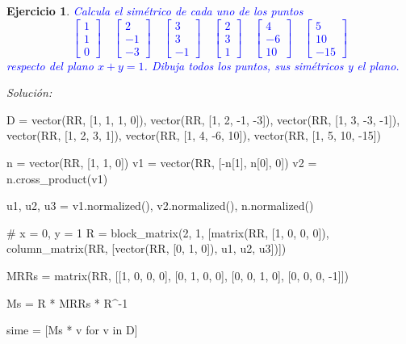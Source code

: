 \documentclass{amsart}
\newtheorem{ejer}{Ejercicio}
\begin{document}
\newpage


\begin{ejer}
\textcolor{blue}{Calcula el simétrico de cada uno de los puntos
$$
	\left[\begin{array}{c}1\\1\\0\end{array}\right] \quad
	\left[\begin{array}{c}2\\-1\\-3\end{array}\right] \quad
	\left[\begin{array}{c}3\\3\\-1\end{array}\right] \quad
	\left[\begin{array}{c}2\\3\\1\end{array}\right] \quad
	\left[\begin{array}{c}4\\-6\\10\end{array}\right] \quad
	\left[\begin{array}{c}5\\10\\-15\end{array}\right]
$$ 
respecto del plano $x+y=1$. Dibuja todos los puntos, sus simétricos y el plano.}
\end{ejer}

{\it Solución:}

\begin{sageblock}
D = vector(RR, [1, 1, 1, 0]), vector(RR, [1, 2, -1, -3]), vector(RR, [1, 3, -3, -1]), vector(RR, [1, 2, 3, 1]), vector(RR, [1, 4, -6, 10]), vector(RR, [1, 5, 10, -15])

n = vector(RR, [1, 1, 0])
v1 = vector(RR, [-n[1], n[0], 0])
v2 = n.cross_product(v1)

u1, u2, u3 = v1.normalized(), v2.normalized(), n.normalized()

# x = 0, y = 1
R = block_matrix(2, 1, [matrix(RR, [1, 0, 0, 0]), column_matrix(RR, [vector(RR, [0, 1, 0]), u1, u2, u3])])

MRRs = matrix(RR, [[1, 0, 0, 0], [0, 1, 0, 0],  [0, 0, 1, 0], [0, 0, 0, -1]])

Ms = R * MRRs * R^-1

sime = [Ms * v for v in D]
\end{sageblock}
\end{document}
